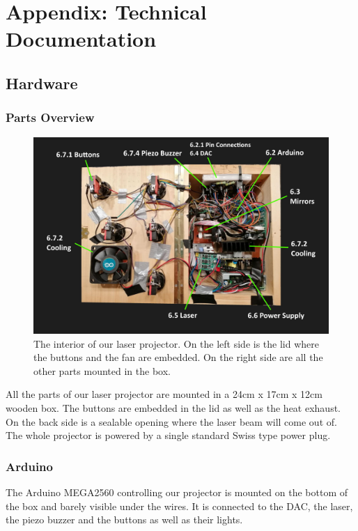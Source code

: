 \documentclass{report}
\begin{document}
\part{Appendix: Technical Documentation}\label{documentation}

\chapter{Hardware}\label{hardware}
\section{Parts Overview}



\begin{figure}[h]
	\centering
	\includegraphics[width=\textwidth]{parts.jpg}
	\caption{The interior of our laser projector. On the left side is the lid where the buttons and the fan are embedded. On the right side are all the other parts mounted in the box.}
	\label{img:parts}
\end{figure}

All the parts of our laser projector are mounted in a 24cm x 17cm x 12cm wooden box. The buttons are embedded in the lid as well as the heat exhaust. On the back side is a sealable opening where the laser beam will come out of. The whole projector is powered by a single standard Swiss type power plug.

\section{Arduino}

The Arduino MEGA2560 controlling our projector is mounted on the bottom of the box and barely visible under the wires. It is connected to the DAC, the laser, the piezo buzzer and the buttons as well as their lights.
\end{document}
